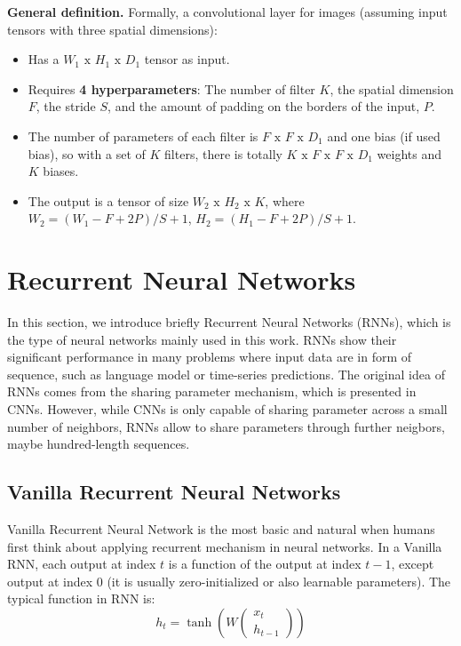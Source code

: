 \textbf{General definition.} Formally, a convolutional layer for images (assuming input tensors with three spatial dimensions):
\begin{itemize}
    \item Has a $\displaystyle W_1 \text{ x } H_1 \text{ x } D_1$ tensor as input.
    \item Requires \textbf{4 hyperparameters}: The number of filter $\displaystyle K$, the spatial dimension $\displaystyle F$, the stride $\displaystyle S$, and the amount of padding on the borders of the input, $\displaystyle P$.
    \item The number of parameters of each filter is $\displaystyle F \text{ x } F \text{ x } D_1$ and one bias (if used bias), so with a set of $\displaystyle K$ filters, there is totally $\displaystyle K \text{ x } F \text{ x } F \text{ x } D_1$ weights and $\displaystyle K$ biases.
    \item The output is a tensor of size $\displaystyle W_2 \text{ x } H_2 \text{ x } K$, where $\displaystyle W_2 = (W_1 - F + 2P)/S + 1$, $\displaystyle H_2 = (H_1 - F + 2P)/S + 1$.
\end{itemize}



\section{Recurrent Neural Networks}
In this section, we introduce briefly Recurrent Neural Networks (RNNs), which is the type of neural networks mainly used in this work. RNNs show their significant performance in many problems where input data are in form of sequence, such as language model or time-series predictions. The original idea of RNNs comes from the sharing parameter mechanism, which is presented in CNNs. However, while CNNs is only capable of sharing parameter across a small number of neighbors, RNNs allow to share parameters through further neigbors, maybe hundred-length sequences.  

\subsection{Vanilla Recurrent Neural Networks}
Vanilla Recurrent Neural Network is the most basic and natural when humans first think about applying recurrent mechanism in neural networks. In a Vanilla RNN, each output at index $\displaystyle t$ is a function of the output at index $\displaystyle t - 1$, except output at index $\displaystyle 0$ (it is usually zero-initialized or also learnable parameters). The typical function in RNN is:
\[ h_t = \tanh \left( W\begin{pmatrix} x_t \\ h_{t-1} \end{pmatrix} \right) \]

